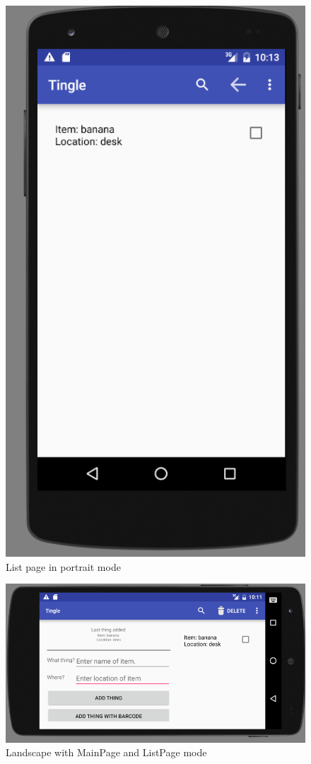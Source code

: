 \documentclass{article}
\begin{document}
\begin{figure}[h]
	\centering
	\includegraphics[scale=0.7]{"listPortrait"}
	\caption{List page in portrait mode}
	\label{fig:listPortrait}
\end{figure}
\begin{figure}[h!]
	\centering
	\includegraphics[scale=0.7]{"landscapeMode"}
	\caption{Landscape with MainPage and ListPage mode}
	\label{fig:landscapeMode}
\end{figure}
\end{document}
